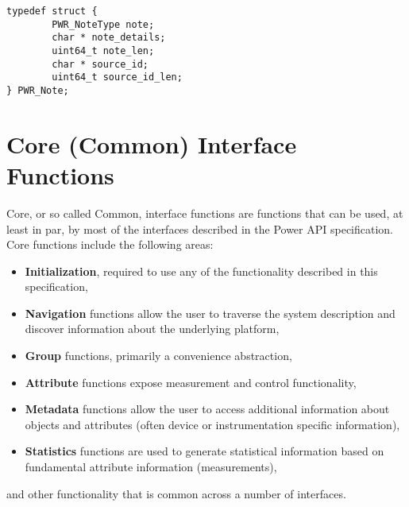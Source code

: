 \documentclass[12pt]{report} %
\providecommand{\DIFaddbegin}{} %
\providecommand{\DIFaddend}{} %
\newcommand{\DIFaddincludegraphics}[2][]{{\color{blue}\fbox{\DIFOincludegraphics[#1]{#2}}}} %
\DeclareRobustCommand{\DIFaddbegin}{\DIFOaddbegin \let\includegraphics\DIFaddincludegraphics} %
\DeclareRobustCommand{\DIFaddend}{\DIFOaddend \let\includegraphics\DIFOincludegraphics} %
\begin{document}
\begin{center}
\begin{minipage}{.95\linewidth}%
\begin{lstlisting}
typedef struct {
        PWR_NoteType note;
        char * note_details;
        uint64_t note_len;
        char * source_id;
        uint64_t source_id_len;
} PWR_Note;
\end{lstlisting}
\end{minipage}
\end{center}




	\DIFaddend \chapter{Core (Common) Interface Functions}\label{chap:Common}
\DIFaddbegin \newcommand{\ArgHdr}{   \begin{center}
			\begin{tabular}{ | p{5cm} | p{2.1cm} | p{7.5cm} |}
			\hline 
			\textbf{Argument(s)} & \textbf{Input } & \textbf{Description} \\  
			 		     & \textbf{and/or} & \\ 
					     & \textbf{Output} & \\ 
			\hline 
}
\newcommand{\ArgLn}[3]{\texttt{#1} & #2 & #3 \\ \hline}
\newcommand{\ArgFtr}{ 	\end{tabular}
			\end{center}
}
\DIFaddend 



Core, or so called Common, interface functions are functions that can be used, at least in par, by most of the interfaces described in the Power API specification. 
Core functions include the following areas:
\begin{itemize}[noitemsep,nolistsep] 
\item{\textbf{Initialization}, required to use any of the functionality described in this specification, }
\item{\textbf{Navigation}  functions allow the user to traverse the system description and discover information about the underlying platform, }
\item{\textbf{Group} functions, primarily a convenience abstraction,}
\item{\textbf{Attribute} functions expose measurement and control functionality, }
\item{\textbf{Metadata} functions allow the user to access additional information about objects and attributes (often device or instrumentation specific information), }
\item{\textbf{Statistics} functions are used to generate statistical information based on fundamental attribute information (measurements),}
\end{itemize}
and other functionality that is common across a number of interfaces.
\end{document}
